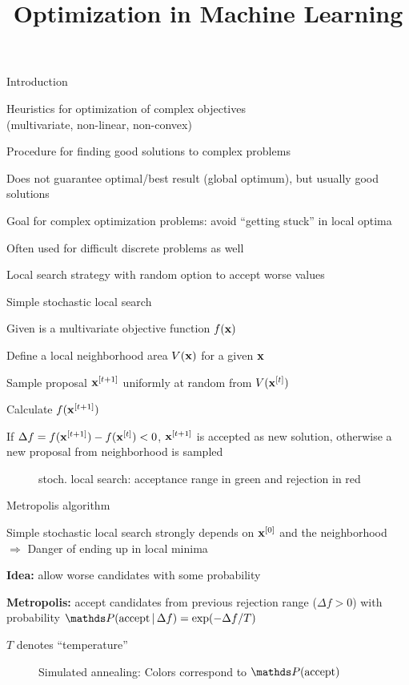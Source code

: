 \documentclass[11pt,compress,t,notes=noshow, xcolor=table]{beamer}
\title{Optimization in Machine Learning}
\begin{document}

\begin{framei}[fs=normalsize,sep=L]{Introduction}
\item Heuristics for optimization of complex objectives\\ (multivariate, non-linear, non-convex)
\item Procedure for finding good solutions to complex problems
\item Does not guarantee optimal/best result (global optimum), but usually good solutions
\item Goal for complex optimization problems: avoid \enquote{getting stuck} in local optima
\item Often used for difficult discrete problems as well
\item Local search strategy with random option to accept worse values
\end{framei}

\begin{framei}{Simple stochastic local search}
\item Given is a multivariate objective function $f(\mathbf{x})$
\item Define a local neighborhood area $V(\mathbf{x})$ for a given $\mathbf{x}$
\item Sample proposal $\mathbf{x}^{[t+1]}$ uniformly at random from $V(\mathbf{x}^{[t]})$
\item Calculate $f(\mathbf{x}^{[t+1]})$
\item If $\Delta f = f(\mathbf{x}^{[t+1]}) - f(\mathbf{x}^{[t]}) < 0$, $\mathbf{x}^{[t+1]}$ is accepted as new solution, otherwise a new proposal from neighborhood is sampled
\begin{figure}
\caption*{stoch. local search: acceptance range in green and rejection in red}
\end{figure}
\end{framei}


\begin{framei}{Metropolis algorithm}
\item Simple stochastic local search strongly depends on $\mathbf{x}^{[0]}$ and the neighborhood \\
$\Rightarrow$ Danger of ending up in local minima
\item \textbf{Idea:} allow worse candidates with some probability
\item \textbf{Metropolis:} accept candidates from previous rejection range ($\Delta f > 0$) with probability $\P(\text{accept} \,|\, \Delta f) = \exp(-\Delta f / T)$
\item $T$ denotes \enquote{temperature}
\begin{figure}
\caption*{
\footnotesize
Simulated annealing: Colors correspond to $\P(\text{accept})$}
\end{figure}
\end{framei}
\end{document}
